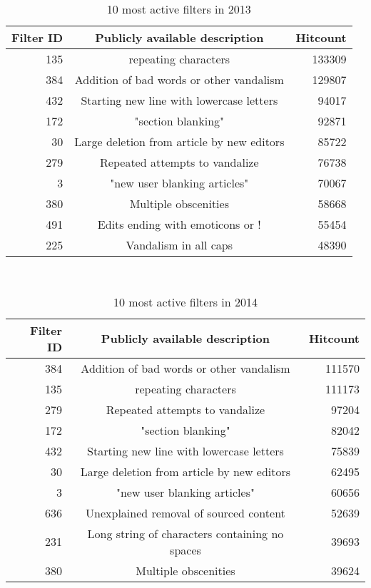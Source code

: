 \begin{table}
  \centering
  \begin{tabular}{r c r }
    Filter ID & Publicly available description & Hitcount \\
    \hline
    135 & repeating characters & 133309 \\
    384 & Addition of bad words or other vandalism & 129807 \\
    432 & Starting new line with lowercase letters & 94017 \\
    172 & "section blanking" & 92871 \\
    30 & Large deletion from article by new editors & 85722 \\
    279 & Repeated attempts to vandalize & 76738 \\
    3 & "new user blanking articles" & 70067 \\
    380 & Multiple obscenities & 58668 \\
    491 & Edits ending with emoticons or ! & 55454 \\
    225 & Vandalism in all caps & 48390 \\
  \end{tabular}
  \caption{10 most active filters in 2013}~\label{tab:most-active-2013}
\end{table}

\begin{table}
  \centering
  \begin{tabular}{r c r }
    Filter ID & Publicly available description & Hitcount \\
    \hline
    384 & Addition of bad words or other vandalism & 111570 \\
    135 & repeating characters & 111173 \\
    279 & Repeated attempts to vandalize & 97204 \\
    172 & "section blanking" & 82042 \\
    432 & Starting new line with lowercase letters & 75839 \\
    30  & Large deletion from article by new editors & 62495 \\
    3 & "new user blanking articles" & 60656 \\
    636 & Unexplained removal of sourced content & 52639 \\
    231 & Long string of characters containing no spaces & 39693 \\
    380 & Multiple obscenities & 39624 \\
  \end{tabular}
  \caption{10 most active filters in 2014}~\label{tab:most-active-2014}
\end{table}

